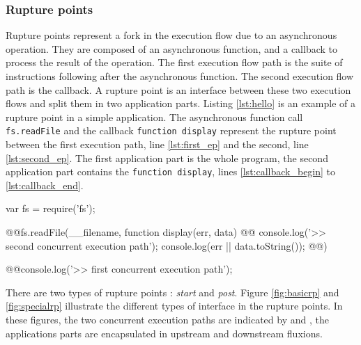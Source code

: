 \subsubsection{Rupture points}

Rupture points represent a fork in the execution flow due to an asynchronous operation.
They are composed of an asynchronous function, and a callback to process the result of the operation.
The first execution flow path is the suite of instructions following after the asynchronous function.
The second execution flow path is the callback.
A rupture point is an interface between these two execution flows and split them in two application parts.
Listing \ref{lst:hello} is an example of a rupture point in a simple application.
The asynchronous function call \texttt{fs.readFile} and the callback \texttt{function display} represent the rupture point between the first execution path, line \ref{lst:first_ep} and the second, line \ref{lst:second_ep}.
The first application part is the whole program, the second application part contains the \texttt{function display}, lines \ref{lst:callback_begin} to \ref{lst:callback_end}.

\begin{code}[js, caption={Example of a rupture point : an asynchronous function call, \texttt{fs.readFile()}, with a callback parameter, \texttt{function display}},label={lst:hello}]
var fs = require('fs');

@\label{lst:callback_begin}@fs.readFile(__filename, function display(err, data) {
@\label{lst:second_ep}@  console.log('>> second concurrent execution path');
  console.log(err || data.toString());
@\label{lst:callback_end}@})

@\label{lst:first_ep}@console.log('>> first concurrent execution path');
\end{code}


There are two types of rupture points : \textit{start} and \textit{post}.
Figure \ref{fig:basicrp} and \ref{fig:specialrp} illustrate the different types of interface in the rupture points.
In these figures, the two concurrent execution paths are indicated by  and , the applications parts are encapsulated in upstream and downstream fluxions.

